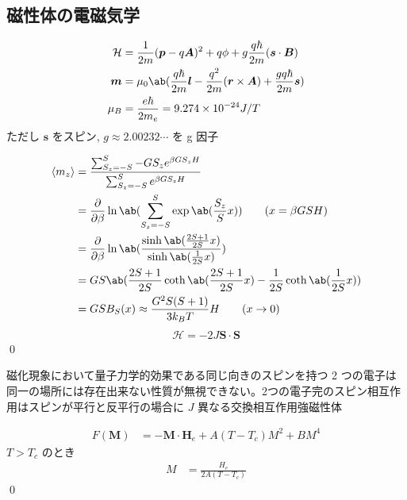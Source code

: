 \documentclass[uplatex,dvipdfmx,a4paper,11pt]{jlreq}
\makeatletter
\newcommand{\BB}{\bm{B}}
\newcommand{\HH}{\bm{H}}
\newcommand{\MM}{\bm{M}}
\renewcommand{\AA}{\bm{A}}
\newcommand{\rr}{\bm{r}}
\newcommand{\pp}{\bm{p}}
\renewcommand{\SS}{\bm{S}}
\numberwithin{equation}{section}
\theoremstyle{definition}
\renewenvironment{proof}[1][\proofname]{\par
  \normalfont
  \topsep6\p@\@plus6\p@ \trivlist
  \item[\hskip\labelsep{\bfseries #1}\@addpunct{\bfseries}]\ignorespaces\quad\par
}{%
  \qed\endtrivlist\@endpefalse
}
\renewcommand\proofname{証明}
\makeatother
\begin{document}
\subsection{磁性体の電磁気学}
\begin{theorem}[磁気現象]
  \begin{align}
    \mathcal{H} & = \frac{1}{2m}(\pp - q\AA)^2 + q\phi + g\frac{q\hbar}{2m}(\bm{s}\cdot\BB)                     \\
    \bm{m}      & = \mu_0\ab(\frac{q\hbar}{2m}\bm{l} - \frac{q^2}{2m}(\rr\times\AA) + \frac{gq\hbar}{2m}\bm{s}) \\
    \mu_B       & = \frac{e\hbar}{2m_e} = 9.274\times 10^{-24} J/T
  \end{align}
  ただし $\bm{s}$ をスピン, $g \approx 2.00232\cdots$ を g 因子
\end{theorem}
\begin{proof}
  \begin{align}
    \langle m_z\rangle & = \frac{\sum_{S_z = -S}^{S}-GS_ze^{\beta GS_zH}}{\sum_{S_z = -S}^{S}e^{\beta GS_zH}}       \\
                       & = \diffp{}{\beta}\ln\ab(\sum_{S_z = -S}^{S}\exp\ab(\frac{S_z}{S}x)) \qquad (x = \beta GSH) \\
                       & = \diffp{}{\beta}\ln\ab(\frac{\sinh\ab(\frac{2S+1}{2S}x)}{\sinh\ab(\frac{1}{2S}x)})        \\
                       & = GS\ab(\frac{2S+1}{2S}\coth\ab(\frac{2S+1}{2S}x) - \frac{1}{2S}\coth\ab(\frac{1}{2S}x))   \\
                       & = GSB_S(x) \approx \frac{G^2S(S + 1)}{3k_BT}H \qquad (x\to 0)
  \end{align}
  \begin{align}
    \mathcal{H} = -2J\SS\cdot\SS
  \end{align}
\end{proof}
\begin{definition}[強磁性体]
  磁化現象において量子力学的効果である同じ向きのスピンを持つ 2 つの電子は同一の場所には存在出来ない性質が無視できない。2つの電子完のスピン相互作用はスピンが平行と反平行の場合に $J$ 異なる交換相互作用強磁性体
\end{definition}
\begin{proof}
  \begin{align}
    F(\MM) & = -\MM\cdot\HH_e + A(T - T_c)M^2 + BM^4
  \end{align}
  $T > T_c$ のとき
  \begin{align}
    M & = \frac{H_e}{2A(T - T_c)}
  \end{align}
\end{proof}
\end{document}
